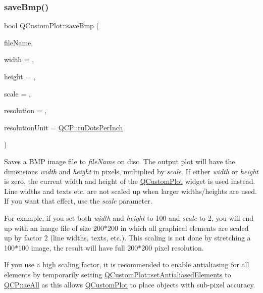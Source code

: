 \subsubsection{\texorpdfstring{save\+Bmp()}{saveBmp()}}
{\footnotesize\ttfamily bool Q\+Custom\+Plot\+::save\+Bmp (\begin{DoxyParamCaption}\item[{const Q\+String \&}]{file\+Name,  }\item[{int}]{width = {},  }\item[{int}]{height = {},  }\item[{double}]{scale = {},  }\item[{int}]{resolution = {},  }\item[{\mbox{\hyperlink{namespace_q_c_p_a715d46153da230990aa887d0f0602452}{Q\+C\+P\+::\+Resolution\+Unit}}}]{resolution\+Unit = {\ttfamily \mbox{\hyperlink{namespace_q_c_p_a715d46153da230990aa887d0f0602452affb887d8efe79c39a1aca2acd7002afc}{Q\+C\+P\+::ru\+Dots\+Per\+Inch}}} }\end{DoxyParamCaption})}

Saves a B\+MP image file to {\itshape file\+Name} on disc. The output plot will have the dimensions {\itshape width} and {\itshape height} in pixels, multiplied by {\itshape scale}. If either {\itshape width} or {\itshape height} is zero, the current width and height of the \mbox{\hyperlink{class_q_custom_plot}{Q\+Custom\+Plot}} widget is used instead. Line widths and texts etc. are not scaled up when larger widths/heights are used. If you want that effect, use the {\itshape scale} parameter.

For example, if you set both {\itshape width} and {\itshape height} to 100 and {\itshape scale} to 2, you will end up with an image file of size 200$\ast$200 in which all graphical elements are scaled up by factor 2 (line widths, texts, etc.). This scaling is not done by stretching a 100$\ast$100 image, the result will have full 200$\ast$200 pixel resolution.

If you use a high scaling factor, it is recommended to enable antialiasing for all elements by temporarily setting \mbox{\hyperlink{class_q_custom_plot_af6f91e5eab1be85f67c556e98c3745e8}{Q\+Custom\+Plot\+::set\+Antialiased\+Elements}} to \mbox{\hyperlink{namespace_q_c_p_ae55dbe315d41fe80f29ba88100843a0caa897c232a0ffc8368e7c100ffc59ef31}{Q\+C\+P\+::ae\+All}} as this allows \mbox{\hyperlink{class_q_custom_plot}{Q\+Custom\+Plot}} to place objects with sub-\/pixel accuracy.

